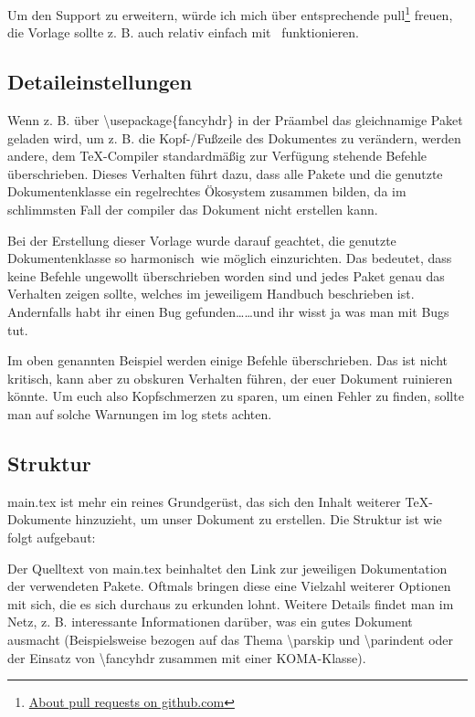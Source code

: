 Um den Support zu erweitern, würde ich mich über entsprechende \gls{pull}\footnote{\href{https://help.github.com/en/articles/about-pull-requests}{About pull requests on github.com}} freuen, die Vorlage sollte z. B. auch relativ einfach mit \ funktionieren.%
\subsection{Detaileinstellungen}%
\label{detail-grundl}
Wenn z. B. über \textbackslash usepackage\{fancyhdr\} in der Präambel das gleichnamige Paket geladen wird, um z. B. die Kopf-/Fußzeile des Dokumentes zu verändern, werden andere, dem \TeX{}-Compiler standardmäßig zur Verfügung stehende Befehle überschrieben. Dieses Verhalten führt dazu, dass alle Pakete und die genutzte Dokumentenklasse ein regelrechtes Ökosystem zusammen bilden, da im schlimmsten Fall der \gls{compiler} das Dokument nicht erstellen kann.

Bei der Erstellung dieser Vorlage wurde darauf geachtet, die genutzte Dokumentenklasse so \glqq harmonisch\grqq\ wie möglich einzurichten. Das bedeutet, dass keine Befehle ungewollt überschrieben worden sind und jedes Paket genau das Verhalten zeigen sollte, welches im jeweiligem Handbuch beschrieben ist. Andernfalls habt ihr einen Bug gefunden\dots \dots und ihr wisst ja was man mit Bugs tut.

Im oben genannten Beispiel werden einige Befehle überschrieben. Das ist nicht kritisch, kann aber zu obskuren Verhalten führen, der euer Dokument ruinieren könnte. Um euch also Kopfschmerzen zu sparen, um einen Fehler zu finden, sollte man auf solche Warnungen im log stets achten.%
\subsection{Struktur}%
\label{sec:struct}
main.tex ist mehr ein reines Grundgerüst, das sich den Inhalt weiterer \TeX{}-Do\-ku\-men\-te hinzuzieht, um unser Dokument zu erstellen. Die Struktur ist wie folgt aufgebaut:



Der Quelltext von main.tex beinhaltet den Link zur jeweiligen Dokumentation der verwendeten Pakete. Oftmals bringen diese eine Vielzahl weiterer Optionen mit sich, die es sich durchaus zu erkunden lohnt.
Weitere Details findet man im Netz, z. B. interessante Informationen darüber, was ein gutes Dokument ausmacht (Beispielsweise bezogen auf das Thema \textbackslash parskip und \textbackslash parindent oder der Einsatz von \textbackslash fancyhdr zusammen mit einer KOMA-Klasse).%
